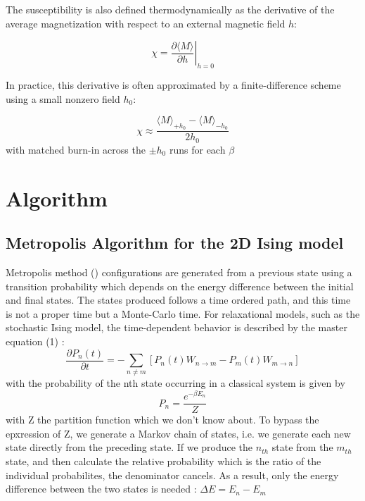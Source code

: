 \documentclass{article}
\begin{document}
The susceptibility is also defined thermodynamically as the derivative of the average magnetization with respect to an external magnetic field $h$: \cite{2}


\begin{equation}
\chi = \left. \frac{\partial \langle M \rangle}{\partial h} \right|_{h=0}
\end{equation}

In practice, this derivative is often approximated by a finite-difference scheme using a small nonzero field $h_0$:

\begin{equation}
\chi \approx \frac{\langle M \rangle_{+h_0} - \langle M \rangle_{-h_0}}{2 h_0}
\end{equation}
with matched burn-in across the $\pm h_0$ runs for each $\beta$

\section{Algorithm }

\subsection{Metropolis Algorithm for the 2D Ising model}

Metropolis method (\cite{4}) configurations are
generated from a previous state using a transition probability which depends
on the energy difference between the initial and final states. The states produced follows a time ordered path, and this time is not a proper time but a Monte-Carlo time. 
For relaxational models, such as the stochastic Ising model, the time-dependent behavior is described by the master equation (1) : 
\begin{equation}
\frac{\partial P_n(t)}{\partial t}
= - \sum_{n \neq m} \left[ P_n(t) W_{n \to m} - P_m(t) W_{m \to n} \right]
\end{equation} 
with the probability of the nth state occurring in a classical system is given by
\begin{equation}
P_n = \frac{e^{-\beta E_n}}{Z}
\end{equation} 
with Z the partition function which we don't know about. To bypass the epxression of Z, we generate a Markov chain of states, i.e. we generate each new state directly from the preceding state. If we produce the $n_{th}$ state from the $m_{th}$ state, and then calculate the
relative probability which is the ratio of the individual probabilites, the denominator cancels. As a result, only the energy difference between the two states is needed : $\Delta E = E_n - E_m$
\end{document}
